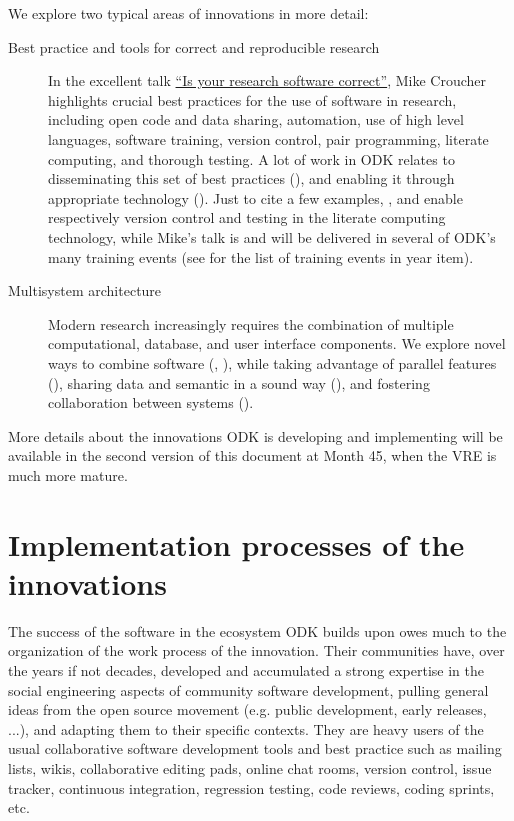 \documentclass{deliverablereport}
\begin{document}
We explore two typical areas of innovations in more detail:
\begin{description}
\item[Best practice and tools for correct and reproducible research]
  In the excellent talk
  \href{https://mikecroucher.github.io/MLPM_talk/}{``Is your research
    software correct''}, Mike Croucher highlights crucial best
  practices for the use of software in research, including open code
  and data sharing, automation, use of high level languages, software
  training, version control, pair programming, literate computing, and thorough
  testing. A lot of work in ODK relates to disseminating this set of
  best practices (), and enabling it through
  appropriate technology ().  Just to cite a few
  examples, , and
   enable respectively version control
  and testing in the \Jupyter literate computing technology, while
  Mike's talk is and will be delivered in several of ODK's many
  training events (see  for the list
  of training events in year item). 
  \item[Multisystem architecture] Modern research increasingly
    requires  the combination of multiple
    computational, database, and user
  interface components. We explore novel ways to combine software
  (, ), while taking
  advantage of parallel features (), sharing data and
  semantic in a sound way (), and fostering
  collaboration between systems ().
\end{description}

More details about the innovations ODK is developing and implementing
will be available in the second version of this document at Month 45,
when the VRE is much more mature.


\section{Implementation processes of the innovations}

The success of the software in the ecosystem ODK builds upon owes much
to the organization of the work process of the innovation. Their
communities have, over the years if not decades, developed and
accumulated a strong expertise in the social engineering aspects of
community software development, pulling general ideas from the open
source movement (e.g. public development, early releases, ...), and
adapting them to their specific contexts. They are heavy users of the
usual collaborative software development tools and best practice such
as mailing lists, wikis, collaborative editing pads, online chat
rooms, version control, issue tracker, continuous integration,
regression testing, code reviews, coding sprints, etc.
\end{document}

